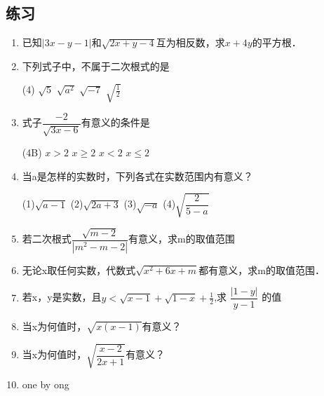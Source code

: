       \subsection{练习}
      \begin{enumerate}
       \item  已知$|3 x-y-1|$和$\sqrt{2 x+y-4}$互为相反数，求$x+4 y$的平方根．
       \item \vspace{1.7cm} 下列式子中，不属于二次根式的是
       \begin{tasks}(4)
           \task $\sqrt{5}$
           \task $\sqrt{a^{2}}$
           \task $\sqrt{-7}$
           \task $\sqrt{\frac{1}{2}}$
        \end{tasks}
           \item  式子$\dfrac{-2}{\sqrt{3 x-6}}$有意义的条件是  
    \begin{tasks}(4B)
    \task $x>2$
    \task $x \geq 2$
    \task $x<2$
    \task $x \leqslant 2$
    \end{tasks}      
       
       \item 当a是怎样的实数时，下列各式在实数范围内有意义？   \par
       (1)$\sqrt{a-1}$ \hfil (2)$\sqrt{2 a+3}$ \hfil (3)$\sqrt{-a}$ \hfil (4)$\sqrt{\dfrac{2}{5-a}}$
       \item  若二次根式$\dfrac{\sqrt{m-2}}{|m^{2}-m-2|}$有意义，求m的取值范围
        \item  \vspace{2cm}  无论x取任何实数，代数式$\sqrt{x^{2}+6 x+m}$都有意义，求m的取值范围．
        \item \vspace{2cm}  若x，y是实数，且$y<\sqrt{x-1}+\sqrt{1-x}+\frac{1}{2}$,求 $\dfrac{|1-y|}{y-1}$       的值
        \item \vspace{2cm}  当x为何值时，$\sqrt{x(x-1)}$有意义？
        \item \vspace{2cm}  当x为何值时，$\sqrt{\dfrac{x-2}{2 x+1}}$有意义？
        \item one by ong
    \end{enumerate}
      

                     



